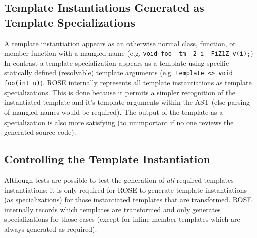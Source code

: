 {\subsection{Template Instantiations Generated as Template Specializations}
   A template instantiation appears as an otherwise normal class, function, or member
function with a mangled name (e.g. {\tt void foo\_\_tm\_\_2\_i\_\_FiZ1Z\_v(i);})
In contrast a template specialization appears as a template using specific
statically defined (resolvable) template arguments (e.g. 
{\tt template <> void foo(int u)}).  ROSE internally represents all 
template instantiations as template specializations.  This is done 
because it permits a simpler recognition of the instantiated template and it's template
arguments within the AST (else parsing of mangled names would be required).  The output 
of the template as a specialization is also more satisfying (to unimportant if no
one reviews the generated source code).


\subsection{Controlling the Template Instantiation}
   Although tests are possible to test the generation of {\em all} required 
templates instantiations; it is only required for ROSE to generate template
instantiations (as specializations) for those instantiated templates that are
transformed.  ROSE internally records which templates are transformed
and only generates specializations for those cases (except for inline member
templates which are always generated as required).


}
